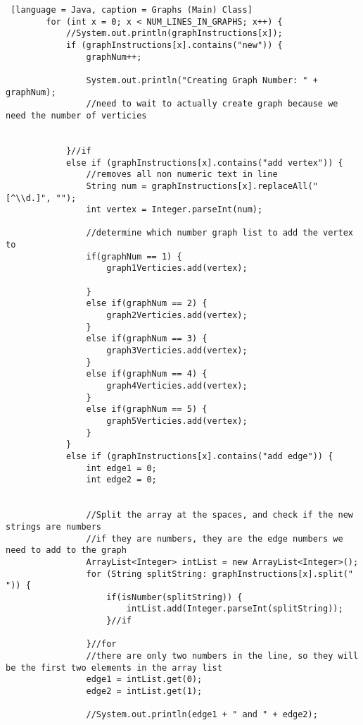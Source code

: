\documentclass{article}
\begin{document}
\begin{lstlisting} [language = Java, caption = Graphs (Main) Class]
        for (int x = 0; x < NUM_LINES_IN_GRAPHS; x++) {
            //System.out.println(graphInstructions[x]);
            if (graphInstructions[x].contains("new")) {
                graphNum++;

                System.out.println("Creating Graph Number: " + graphNum);
                //need to wait to actually create graph because we need the number of verticies
                
                
            }//if
            else if (graphInstructions[x].contains("add vertex")) {
                //removes all non numeric text in line
                String num = graphInstructions[x].replaceAll("[^\\d.]", "");
                int vertex = Integer.parseInt(num);

                //determine which number graph list to add the vertex to
                if(graphNum == 1) {
                    graph1Verticies.add(vertex);
                    
                }
                else if(graphNum == 2) {
                    graph2Verticies.add(vertex);
                }
                else if(graphNum == 3) {
                    graph3Verticies.add(vertex);
                }
                else if(graphNum == 4) {
                    graph4Verticies.add(vertex);
                }
                else if(graphNum == 5) {
                    graph5Verticies.add(vertex);
                }
            }
            else if (graphInstructions[x].contains("add edge")) {
                int edge1 = 0;
                int edge2 = 0;
                
                
                //Split the array at the spaces, and check if the new strings are numbers
                //if they are numbers, they are the edge numbers we need to add to the graph
                ArrayList<Integer> intList = new ArrayList<Integer>();
                for (String splitString: graphInstructions[x].split(" ")) {
                    if(isNumber(splitString)) {
                        intList.add(Integer.parseInt(splitString));
                    }//if
            
                }//for
                //there are only two numbers in the line, so they will be the first two elements in the array list
                edge1 = intList.get(0);
                edge2 = intList.get(1);

                //System.out.println(edge1 + " and " + edge2);


\end{lstlisting}
\end{document}
